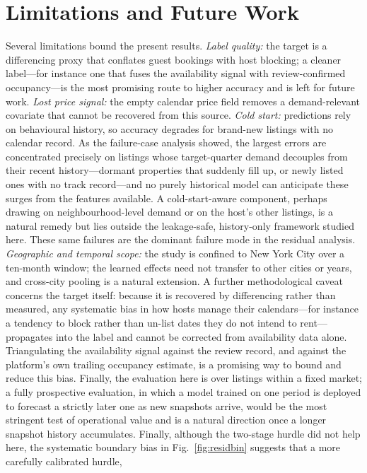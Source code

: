 \documentclass[review,12pt]{elsarticle}
\begin{document}
\section{Limitations and Future Work}
\label{sec:limits}
Several limitations bound the present results. \emph{Label quality:} the target is
a differencing proxy that conflates guest bookings with host blocking; a cleaner
label---for instance one that fuses the availability signal with review-confirmed
occupancy---is the most promising route to higher accuracy and is left for future
work. \emph{Lost price signal:} the empty calendar price field removes a
demand-relevant covariate that cannot be recovered from this source.
\emph{Cold start:} predictions rely on behavioural history, so accuracy degrades
for brand-new listings with no calendar record. As the failure-case analysis
showed, the largest errors are concentrated precisely on listings whose
target-quarter demand decouples from their recent history---dormant properties that
suddenly fill up, or newly listed ones with no track record---and no purely
historical model can anticipate these surges from the features available. A
cold-start-aware component, perhaps drawing on neighbourhood-level demand or on the
host's other listings, is a natural remedy but lies outside the leakage-safe,
history-only framework studied here. These same failures are the dominant failure
mode in the residual analysis. \emph{Geographic and temporal scope:} the study is
confined to New York City over a ten-month window; the learned effects need not
transfer to other cities or years, and cross-city pooling is a natural extension. A further methodological caveat
concerns the target itself: because it is recovered by differencing rather than
measured, any systematic bias in how hosts manage their calendars---for instance a
tendency to block rather than un-list dates they do not intend to rent---propagates
into the label and cannot be corrected from availability data alone. Triangulating
the availability signal against the review record, and against the platform's own
trailing occupancy estimate, is a promising way to bound and reduce this bias.
Finally, the evaluation here is over listings within a fixed market; a fully
prospective evaluation, in which a model trained on one period is deployed to
forecast a strictly later one as new snapshots arrive, would be the most stringent
test of operational value and is a natural direction once a longer snapshot history
accumulates.
Finally, although the two-stage hurdle did not help here, the systematic boundary
bias in Fig.~\ref{fig:residbin} suggests that a more carefully calibrated hurdle,
\end{document}
